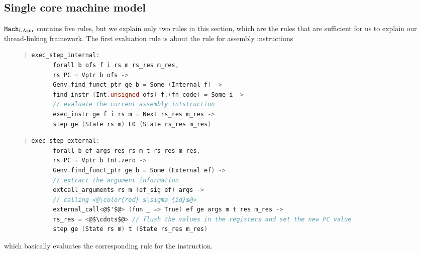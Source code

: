 \subsection{Single core machine model}
\label{chapter:linking:subsec:cpu-local-layer-interface}


${\mathrm{\texttt{Mach}}}_{\mathrm{LAsm}}$ contains five rules, 
but we explain only two rules in this section, which are the rules 
that are sufficient for us to explain our thread-linking framework.
The first evaluation rule is 
about the rule for assembly instructions
\begin{figure}
\begin{lstlisting}[language=C, deletekeywords={unsigned}]
    | exec_step_internal:
        forall b ofs f i rs m rs_res m_res,
        rs PC = Vptr b ofs ->
        Genv.find_funct_ptr ge b = Some (Internal f) ->
        find_instr (Int.unsigned ofs) f.(fn_code) = Some i ->
        // evaluate the current assembly intstruction         
        exec_instr ge f i rs m = Next rs_res m_res ->
        step ge (State rs m) E0 (State rs_res m_res)
\end{lstlisting}

\begin{lstlisting}[language=C]
    | exec_step_external:
        forall b ef args res rs m t rs_res m_res,
        rs PC = Vptr b Int.zero ->
        Genv.find_funct_ptr ge b = Some (External ef) ->
        // extract the argument information
        extcall_arguments rs m (ef_sig ef) args ->
        // calling <@\color{red} $\sigma_{id}$@>
        external_call<@$'$@> (fun _ => True) ef ge args m t res m_res ->
        rs_res = <@$\cdots$@> // flush the values in the registers and set the new PC value
        step ge (State rs m) t (State rs_res m_res)
\end{lstlisting}

\end{figure}
which basically evaluates the corresponding 
rule for the instruction. 
